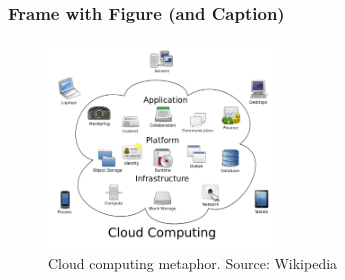 \expandafter\documentclass\expandafter[table, usenames, svgnames, dvipsnames, \classopts]{beamer}
\begin{document}
\begin{frame} 
	\frametitle{\textbf{Frame with Figure (and Caption)}}

	\begin{figure}
		\includegraphics[height=5.5cm]{cloud-computing}
		\caption{Cloud computing metaphor. Source: Wikipedia}
	\end{figure}

\end{frame}
\end{document}
